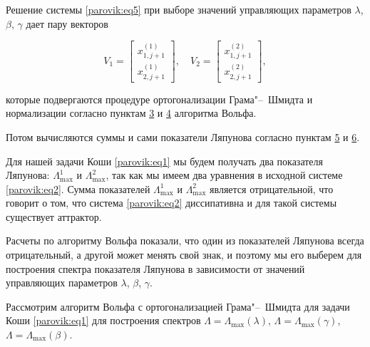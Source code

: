 \smallskip



Решение системы \eqref{parovik:eq5} при выборе значений управляющих параметров $\lambda$, $\beta$, $\gamma $ дает пару векторов 

$${V_1} = \left[ {\begin{array}{*{20}{c}}

	{x_{1,j + 1}^{(1)}}\\

	{x_{2,j + 1}^{(1)}}

	\end{array}} \right], \quad {V_2} = \left[ {\begin{array}{*{20}{c}}

	{x_{1,j + 1}^{(2)}}\\

	{x_{2,j + 1}^{(2)}}

	\end{array}} \right],$$ 

которые подвергаются процедуре ортогонализации Грама"--~Шмидта и нормализации согласно пунктам \hyperlink{par:p3}{3} и \hyperlink{par:p4}{4} алгоритма Вольфа.  

Потом вычисляются суммы и сами показатели Ляпунова согласно пунктам \hyperlink{par:p5}{5} и \hyperlink{par:p6}{6}.



Для нашей задачи Коши \eqref{parovik:eq1} мы будем получать два показателя Ляпунова: $\Lambda _{\max }^1$ и  $\Lambda _{\max }^2$, так как мы имеем два уравнения в исходной системе \eqref{parovik:eq2}. Сумма показателей $\Lambda _{\max }^1$ и $\Lambda _{\max }^2$ является отрицательной, что говорит о том, что система \eqref{parovik:eq2} диссипативна и для такой системы существует аттрактор.



Расчеты по алгоритму Вольфа показали, что один из показателей Ляпунова всегда отрицательный, а другой может менять свой знак, и поэтому мы его выберем для построения спектра показателя Ляпунова в зависимости от значений управляющих параметров $\lambda$, $\beta$, $\gamma $.



\smallskip



 Рассмотрим алгоритм Вольфа с ортогонализацией Грама"--~Шмидта для задачи Коши \eqref{parovik:eq1} для построения спектров $\Lambda=\Lambda_{\max}(\lambda)$, $\Lambda=\Lambda_{\max}(\gamma)$, $\Lambda=\Lambda_{\max}(\beta)$.



